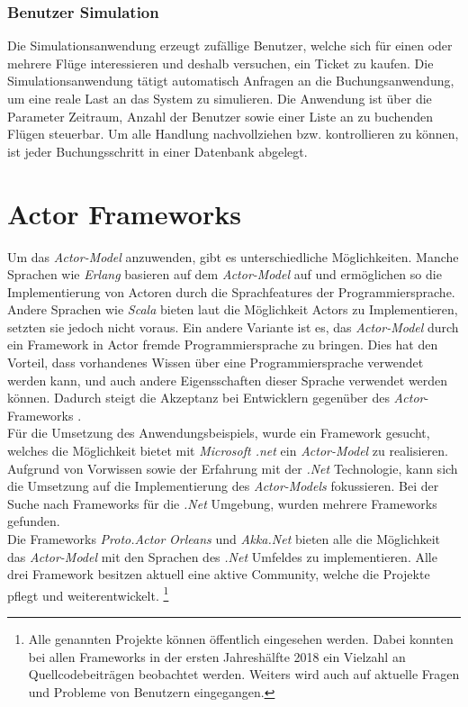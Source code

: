 \subsubsection{Benutzer Simulation}
Die Simulationsanwendung erzeugt zufällige Benutzer, welche sich für einen oder mehrere Flüge interessieren und deshalb versuchen, ein Ticket zu kaufen. Die Simulationsanwendung tätigt automatisch Anfragen an die Buchungsanwendung, um eine reale Last an das System zu simulieren. Die Anwendung ist über die Parameter Zeitraum, Anzahl der Benutzer sowie einer Liste an zu buchenden Flügen steuerbar.  
Um alle Handlung nachvollziehen bzw. kontrollieren zu können, ist jeder Buchungsschritt in einer Datenbank abgelegt.


\section{Actor Frameworks}\label{sec:ActorFrameworks}
Um das \textit{Actor-Model} anzuwenden, gibt es unterschiedliche Möglichkeiten. Manche Sprachen wie \textit{Erlang} basieren auf dem \textit{Actor-Model} auf und ermöglichen so die Implementierung von Actoren \citep{actorComparativeAnalysis} durch die Sprachfeatures der Programmiersprache. Andere Sprachen wie \textit{Scala} bieten laut \cite{haller2012actors} die Möglichkeit Actors zu Implementieren, setzten sie jedoch nicht voraus. Ein andere Variante ist es, das \textit{Actor-Model} durch ein Framework in Actor fremde Programmiersprache zu bringen. Dies hat den Vorteil, dass vorhandenes Wissen über eine Programmiersprache verwendet werden kann, und auch andere Eigensschaften dieser Sprache verwendet werden können. Dadurch steigt die Akzeptanz bei Entwicklern gegenüber des \textit{Actor}-Frameworks \citep{lee2006problem}. \\
Für die Umsetzung des Anwendungsbeispiels, wurde ein Framework gesucht, welches die Möglichkeit bietet mit \textit{Microsoft .net} ein \textit{Actor-Model} zu realisieren. Aufgrund von Vorwissen sowie der Erfahrung mit der \textit{.Net} Technologie, kann sich die Umsetzung auf die Implementierung des \textit{Actor-Models} fokussieren. Bei der Suche nach Frameworks für die \textit{.Net} Umgebung, wurden mehrere Frameworks gefunden. \\
Die Frameworks \textit{Proto.Actor} \textit{Orleans} und \textit{Akka.Net} bieten alle die Möglichkeit das \textit{Actor-Model} mit den Sprachen des \textit{.Net} Umfeldes zu implementieren. Alle drei Framework besitzen aktuell eine aktive Community, welche die Projekte pflegt und weiterentwickelt.
\footnote{Alle genannten Projekte können öffentlich eingesehen werden. Dabei konnten bei allen Frameworks in der ersten Jahreshälfte 2018 ein Vielzahl an Quellcodebeiträgen beobachtet werden. Weiters wird auch auf aktuelle Fragen und Probleme von Benutzern eingegangen.}

